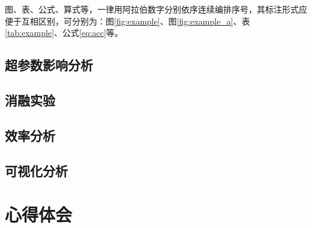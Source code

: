 \documentclass{style/course-report}
\begin{document}
图、表、公式、算式等，一律用阿拉伯数字分别依序连续编排序号，其标注形式应便于互相区别，可分别为：图\ref{fig:example}、图\ref{fig:example_a}、表\ref{tab:example}、公式\ref{eq:acc}等。

\subsection{超参数影响分析}

\subsection{消融实验}

\subsection{效率分析}

\subsection{可视化分析}

\section{心得体会}


 

\end{document}
